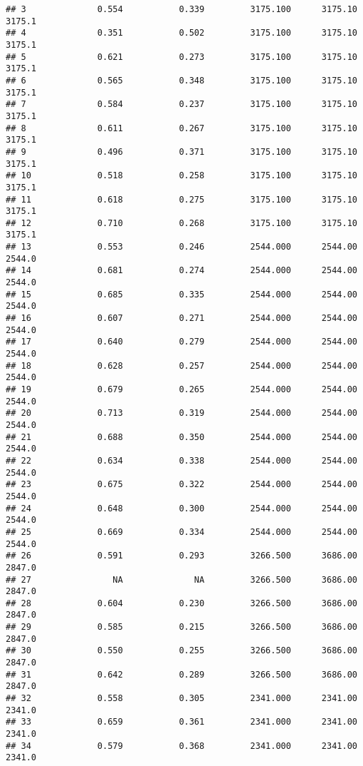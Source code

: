 \documentclass[
]{article}
\begin{document}
\begin{verbatim}
## 3              0.554           0.339         3175.100      3175.10       3175.1
## 4              0.351           0.502         3175.100      3175.10       3175.1
## 5              0.621           0.273         3175.100      3175.10       3175.1
## 6              0.565           0.348         3175.100      3175.10       3175.1
## 7              0.584           0.237         3175.100      3175.10       3175.1
## 8              0.611           0.267         3175.100      3175.10       3175.1
## 9              0.496           0.371         3175.100      3175.10       3175.1
## 10             0.518           0.258         3175.100      3175.10       3175.1
## 11             0.618           0.275         3175.100      3175.10       3175.1
## 12             0.710           0.268         3175.100      3175.10       3175.1
## 13             0.553           0.246         2544.000      2544.00       2544.0
## 14             0.681           0.274         2544.000      2544.00       2544.0
## 15             0.685           0.335         2544.000      2544.00       2544.0
## 16             0.607           0.271         2544.000      2544.00       2544.0
## 17             0.640           0.279         2544.000      2544.00       2544.0
## 18             0.628           0.257         2544.000      2544.00       2544.0
## 19             0.679           0.265         2544.000      2544.00       2544.0
## 20             0.713           0.319         2544.000      2544.00       2544.0
## 21             0.688           0.350         2544.000      2544.00       2544.0
## 22             0.634           0.338         2544.000      2544.00       2544.0
## 23             0.675           0.322         2544.000      2544.00       2544.0
## 24             0.648           0.300         2544.000      2544.00       2544.0
## 25             0.669           0.334         2544.000      2544.00       2544.0
## 26             0.591           0.293         3266.500      3686.00       2847.0
## 27                NA              NA         3266.500      3686.00       2847.0
## 28             0.604           0.230         3266.500      3686.00       2847.0
## 29             0.585           0.215         3266.500      3686.00       2847.0
## 30             0.550           0.255         3266.500      3686.00       2847.0
## 31             0.642           0.289         3266.500      3686.00       2847.0
## 32             0.558           0.305         2341.000      2341.00       2341.0
## 33             0.659           0.361         2341.000      2341.00       2341.0
## 34             0.579           0.368         2341.000      2341.00       2341.0

\end{verbatim}
\end{document}
